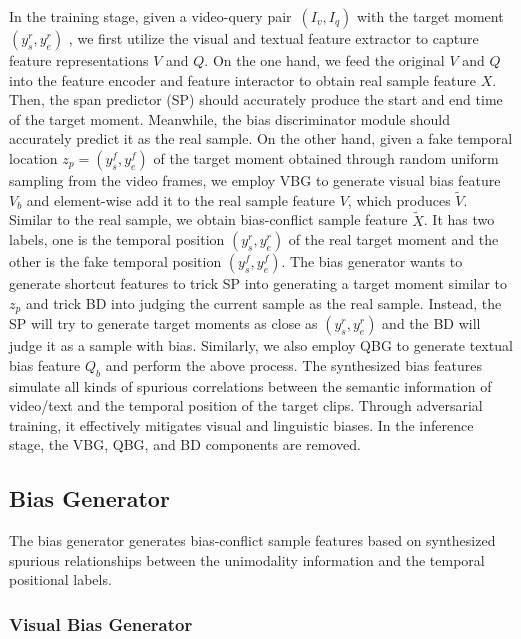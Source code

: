 In the training stage, given a video-query pair~$(I_v,I_q)$ with the target moment~$(y_s^r,y_e^r)$ , we first utilize the visual and textual feature extractor to capture feature representations $V$ and $Q$. 
On the one hand, we feed the original $V$ and $Q$ into the feature encoder and feature interactor to obtain real sample feature $X$. Then, the span predictor (SP) should accurately produce the start and end time of the target moment. Meanwhile, the bias discriminator module should accurately predict it as the real sample. 
On the other hand, given a fake temporal location $z_p=(y_s^f, y_e^f)$ of the target moment obtained through random uniform sampling from the video frames, we employ VBG to generate visual bias feature $V_b$ and element-wise add it to the real sample feature $V$, which produces $\tilde{V}$. Similar to the real sample, we obtain bias-conflict sample feature $\tilde{X}$. It has two labels, one is the temporal position $(y_s^r,y_e^r)$ of the real target moment and the other is the fake temporal position $(y_s^f, y_e^f)$. The bias generator wants to generate shortcut features to trick SP into generating a target moment similar to $z_p$ and trick BD into judging the current sample as the real sample. Instead, the SP will try to generate target moments as close as $(y_s^r,y_e^r)$ and the BD will judge it as a sample with bias. 
Similarly, we also employ QBG to generate textual bias feature $Q_b$ and perform the above process. 
The synthesized bias features simulate all kinds of spurious correlations between the semantic information of video/text and the temporal position of the target clips. Through adversarial training, it effectively mitigates visual and linguistic biases. 
In the inference stage, the VBG, QBG, and BD components are removed. 


\subsection{Bias Generator}

The bias generator generates bias-conflict sample features based on synthesized spurious relationships between the unimodality information and the temporal positional labels. 


\subsubsection{Visual Bias Generator} 

